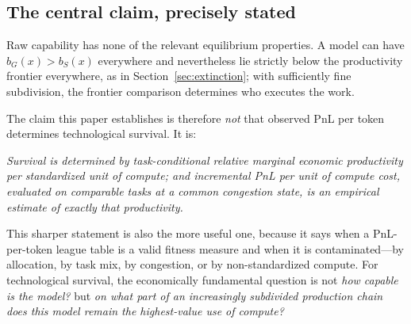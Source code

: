 \documentclass[11pt]{article}
\theoremstyle{definition}
\theoremstyle{remark}
\begin{document}
\subsection{The central claim, precisely stated}

Raw capability has none of the relevant equilibrium properties. A model can have $b_G(x) > b_S(x)$ everywhere and nevertheless lie strictly below the productivity frontier everywhere, as in Section~\ref{sec:extinction}; with sufficiently fine subdivision, the frontier comparison determines who executes the work.

The claim this paper establishes is therefore \emph{not} that observed PnL per token determines technological survival. It is:
\begin{center}
\emph{Survival is determined by task-conditional relative marginal economic productivity per standardized unit of compute; and incremental PnL per unit of compute cost, evaluated on comparable tasks at a common congestion state, is an empirical estimate of exactly that productivity.}
\end{center}
This sharper statement is also the more useful one, because it says when a PnL-per-token league table is a valid fitness measure and when it is contaminated---by allocation, by task mix, by congestion, or by non-standardized compute. For technological survival, the economically fundamental question is not \emph{how capable is the model?} but \emph{on what part of an increasingly subdivided production chain does this model remain the highest-value use of compute?}
\end{document}
